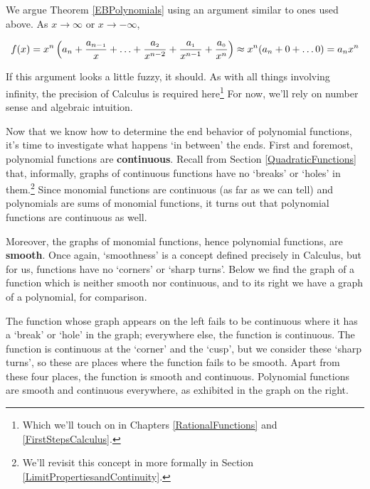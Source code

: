 \documentclass{ximera}
\begin{document}

\medskip


We argue Theorem \ref{EBPolynomials} using an argument similar to ones used above.  As $x \rightarrow \infty$ or $x \rightarrow -\infty$, 

\[ f(x) =  x^{n} \left( a_{n} +\dfrac{a_{n-\mbox{\tiny$1$}}}{x}+ \ldots + \dfrac{a_{\mbox{\tiny$2$}}}{x^{n-2}} + \dfrac{a_{\mbox{\tiny$1$}}}{x^{n-1}}+\dfrac{a_{\mbox{\tiny$0$}}}{x^{n}}\right) \approx x^n( a_{n} + 0 +\ldots 0) = a_{n} x^n \]

If this argument looks a little fuzzy, it should.  As with all things involving infinity, the precision of Calculus is required here\footnote{Which we'll touch on in Chapters \ref{RationalFunctions} and \ref{FirstStepsCalculus}.}  For now, we'll rely on number sense and algebraic intuition.

\medskip

Now that we know how to determine the end behavior of polynomial functions,  it's time to investigate what happens `in between' the ends.  First and foremost, polynomial functions are  \textbf{continuous}.  Recall from Section \ref{QuadraticFunctions} that, informally, graphs of continuous functions have no `breaks' or `holes' in them.\footnote{We'll revisit this concept in more formally in  Section \ref{LimitPropertiesandContinuity}.}   Since monomial functions are continuous (as far as we can tell) and polynomials are sums of monomial functions, it turns out that polynomial functions are continuous as well.  
 
\medskip

Moreover, the graphs of monomial functions, hence polynomial functions, are  \textbf{smooth}.  Once again, `smoothness' is a concept defined precisely in Calculus, but for us,  functions have no `corners' or `sharp turns'.  Below we find the graph of a function which is neither smooth nor continuous, and to its right we have a graph of a polynomial, for comparison.  

\medskip

The function whose graph appears on the left fails to be continuous where it has a `break' or `hole' in the graph;  everywhere else, the function is continuous.  The function is continuous at the `corner' and the `cusp', but we consider these `sharp turns', so these are places where the function fails to be smooth.  Apart from these four places, the function is smooth and continuous.  Polynomial functions are smooth and continuous everywhere, as exhibited in the graph on the right.  
\end{document}
